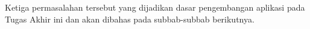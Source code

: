 Ketiga permasalahan tersebut yang dijadikan dasar pengembangan aplikasi pada Tugas Akhir ini dan akan dibahas pada subbab-subbab berikutnya. 




